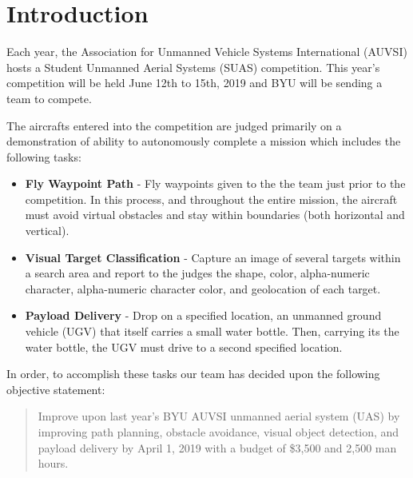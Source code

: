 \documentclass[]{auvsi_doc}
\begin{document}
\begin{AUVSITitlePage}
\begin{artifacttable}
\end{artifacttable}
\end{AUVSITitlePage}


\section{ Introduction}

Each year, the Association for Unmanned Vehicle Systems International (AUVSI) hosts a Student Unmanned Aerial Systems (SUAS) competition. This year’s competition will be held June 12th to 15th, 2019 and BYU will be sending a team to compete.

The aircrafts entered into the competition are judged primarily on a demonstration of ability to autonomously complete a mission which includes the following tasks:

\begin{itemize}
	\item\textbf{Fly Waypoint Path} - Fly waypoints given to the the team just prior to the competition. In this process, and throughout the entire mission, the aircraft must avoid virtual obstacles and stay within boundaries (both horizontal and vertical).
	\item\textbf{Visual Target Classification} - Capture an image of several targets within a search area and report to the judges the shape, color, alpha-numeric character, alpha-numeric character color, and geolocation of each target.
	\item\textbf{Payload Delivery} - Drop on a specified location, an unmanned ground vehicle (UGV) that itself carries a small water bottle. Then, carrying its the water bottle, the UGV must drive to a second specified location.
\end{itemize}

In order, to accomplish these tasks our team has decided upon the following objective statement:

\begin{quote}
Improve upon last year’s BYU AUVSI unmanned aerial system (UAS) by improving path planning, obstacle avoidance, visual object detection, and payload delivery by April 1, 2019 with a budget of \$3,500 and 2,500 man hours.
\end{quote}
\end{document}

